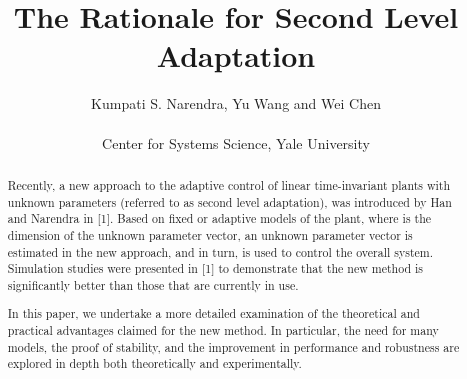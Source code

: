 \documentclass[conference]{IEEEtran}
\begin{document}
\title{The Rationale for Second Level Adaptation}

\pagestyle{fancy}
\author{Kumpati S. Narendra, Yu Wang and Wei Chen\\
\\
{\large Center for Systems Science, Yale University}\\
}













\maketitle

\begin{abstract}
Recently, a new approach to the adaptive control of linear time-invariant plants with unknown parameters (referred to as second level adaptation), was introduced by Han and Narendra in [1]. Based on  fixed or adaptive models of the plant, where  is the dimension of the unknown parameter vector, an unknown parameter vector  is estimated in the new approach, and in turn, is used to control the overall system. Simulation studies were presented in [1] to demonstrate that the new method is significantly better than those that are currently in use.

In this paper, we undertake a more detailed examination of the theoretical and practical advantages claimed for the new method. In particular, the need for many models, the proof of stability, and the improvement in performance and robustness are explored in depth both theoretically and experimentally.
\end{abstract}






\IEEEpeerreviewmaketitle
\end{document}
